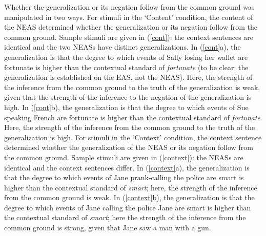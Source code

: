 \documentclass[11pt,fleqn]{article}
\newcommand{\6}{\mbox{$[\hspace*{-.6mm}[$}}
\newcommand{\9}{\mbox{$]\hspace*{-.6mm}]$}}
\begin{document}
Whether the generalization or its negation follow from the common ground was manipulated in two ways. For stimuli in the `Content' condition, the content of the NEAS determined whether the generalization or its negation follow from the common ground. Sample stimuli are given in (\ref{cont}): the context sentences are identical and the two NEASs have distinct generalizations. In (\ref{cont}a), the generalization is that the degree to which events of Sally losing her wallet are fortunate is higher than the contextual standard of {\em fortunate} (to be clear: the generalization is established on the EAS, not the NEAS). Here, the strength of the inference from the common ground to the truth of the generalization is weak, given that the strength of the inference to the negation of the generalization is high. In (\ref{cont}b), the generalization is that the degree to which events of Sue speaking French are fortunate is higher than the contextual standard of {\em fortunate}. Here, the strength of the inference from the common ground to the truth of the generalization is high. For stimuli in the `Context' condition, the context sentence determined whether the generalization of the NEAS or its negation follow from the common ground. Sample stimuli are given in (\ref{context}): the NEASs are identical and the context sentences differ. In (\ref{context}a), the generalization is that the degree to which events of Jane prank-calling the police are smart is higher than the contextual standard of {\em smart}; here, the strength of the inference from the common ground is weak. In (\ref{context}b), the generalization is that the degree to which events of Jane calling the police Jane are smart is higher than the contextual standard of {\em smart}; here the strength of the inference from the common ground is strong, given that Jane saw a man with a gun.
\end{document}
